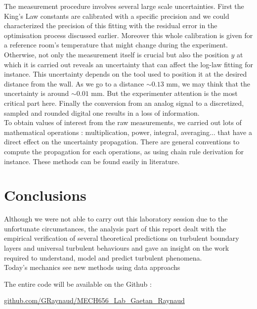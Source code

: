 \documentclass[12pt]{article}
\begin{document}
The measurement procedure involves several large scale uncertainties. First the King's Law constants are calibrated with a specific precision and we could characterized the precision of this fitting with the residual error in the optimisation process discussed earlier. Moreover this whole calibration is given for a reference room's temperature that might change during the experiment. Otherwise, not only the measurement itself is crucial but also the position $y$ at which it is carried out reveals an uncertainty that can affect the log-law fitting for instance. This uncertainty depends on the tool used to position it at the desired distance from the wall. As we go to a distance $\sim 0.13$ \si{mm}, we may think that the uncertainty is around $\sim 0.01$ \si{mm}. But the experimenter attention is the most critical part here. Finally the conversion from an analog signal to a discretized, sampled and rounded digital one results in a loss of information.\\

To obtain values of interest from the raw measurements, we carried out lots of mathematical operations : multiplication, power, integral, averaging... that have a direct effect on the uncertainty propagation. There are general conventions to compute the propagation for each operations, as using chain rule derivation for instance. These methods can be found easily in literature. 

\newpage

\section{Conclusions}



Although we were not able to carry out this laboratory session due to the unfortunate circumstances, the analysis part of this report dealt with the empirical verification of several theoretical predictions on turbulent boundary layers and universal turbulent behaviours and gave an insight on the work required to understand, model and predict turbulent phenomena. \\

Today's mechanics see new methods using data approachs

The entire code will be available on the Github :
\begin{center}
    \href{https://github.com/GRaynaud/MECH656_Lab_Gaetan_Raynaud}{github.com/GRaynaud/MECH656\_Lab\_Gaetan\_Raynaud}

\end{center}
\end{document}
